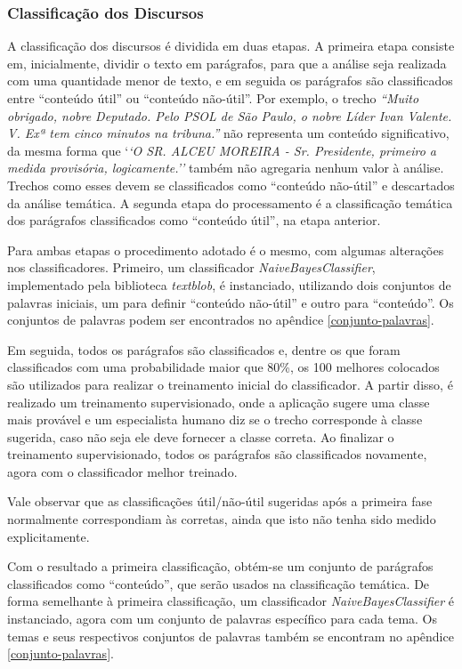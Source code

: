 \subsubsection{Classificação dos Discursos}

A classificação dos discursos é dividida em duas etapas. A primeira etapa consiste em, inicialmente, dividir o texto em parágrafos, para que a análise seja realizada com uma quantidade menor de texto, e em seguida os parágrafos são classificados entre ``conteúdo útil'' ou ``conteúdo não-útil''. Por exemplo, o trecho \textit{``Muito obrigado, nobre Deputado. Pelo PSOL de São Paulo, o nobre Líder Ivan Valente. V. Exª tem cinco minutos na tribuna.''} não representa um conteúdo significativo, da mesma forma que `\textit{`O SR. ALCEU MOREIRA - Sr. Presidente, primeiro a medida provisória, logicamente.''} também não agregaria nenhum valor à análise. Trechos como esses devem se classificados como ``conteúdo não-útil'' e descartados da análise temática. A segunda etapa do processamento é a classificação temática dos parágrafos classificados como ``conteúdo útil'', na etapa anterior.

Para ambas etapas o procedimento adotado é o mesmo, com algumas alterações nos classificadores. Primeiro, um classificador \textit{NaiveBayesClassifier}, implementado pela biblioteca \textit{textblob}, é instanciado, utilizando dois conjuntos de palavras iniciais, um para definir ``conteúdo não-útil'' e outro para ``conteúdo''. Os conjuntos de palavras podem ser encontrados no apêndice \ref{conjunto-palavras}.

Em seguida, todos os parágrafos são classificados e, dentre os que foram classificados com uma probabilidade maior que 80\%, os 100 melhores colocados são utilizados para realizar o treinamento inicial do classificador. A partir disso, é realizado um treinamento supervisionado, onde a aplicação sugere uma classe mais provável e um especialista humano diz se o trecho corresponde à classe sugerida, caso não seja ele deve fornecer a classe correta. Ao finalizar o treinamento supervisionado, todos os parágrafos são classificados novamente, agora com o classificador melhor treinado.

Vale observar que as classificações útil/não-útil sugeridas após a primeira fase normalmente correspondiam às corretas, ainda que isto não tenha sido medido explicitamente.

Com o resultado a primeira classificação, obtém-se um conjunto de parágrafos classificados como ``conteúdo'', que serão usados na classificação temática. De forma semelhante à primeira classificação, um classificador \textit{NaiveBayesClassifier} é instanciado, agora com um conjunto de palavras específico para cada tema. Os temas e seus respectivos conjuntos de palavras também se encontram no apêndice \ref{conjunto-palavras}.

